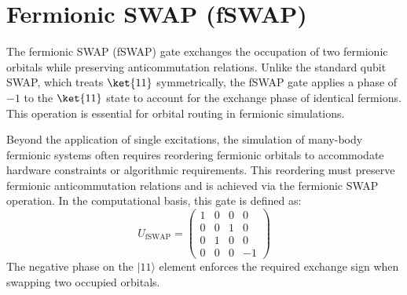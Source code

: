 \cite[chapter III.B]{anand2022quantum}
\cite[chapter 2.1.1]{schleich2025quantum}

\section{Fermionic SWAP (fSWAP)}
The fermionic SWAP (fSWAP) gate exchanges the occupation of two fermionic orbitals while preserving anticommutation relations. Unlike the standard qubit SWAP, which treats $\ket{11}$ symmetrically, the fSWAP gate applies a phase of $-1$ to the $\ket{11}$ state to account for the exchange phase of identical fermions. This operation is essential for orbital routing in fermionic simulations.


Beyond the application of single excitations, the simulation of many-body fermionic systems often requires reordering fermionic orbitals to accommodate hardware constraints or algorithmic requirements. This reordering must preserve fermionic anticommutation relations and is achieved via the fermionic SWAP operation. In the computational basis, this gate is defined as:
\begin{equation}
	U_{\text{fSWAP}} = \begin{pmatrix}
						   1 & 0 & 0 & 0 \\
						   0 & 0 & 1 & 0 \\
						   0 & 1 & 0 & 0 \\
						   0 & 0 & 0 & -1
	\end{pmatrix}
\end{equation}
The negative phase on the $|11\rangle$ element enforces the required exchange sign when swapping two occupied orbitals.

\cite[chapter II.]{Verstraete2009quantum}

